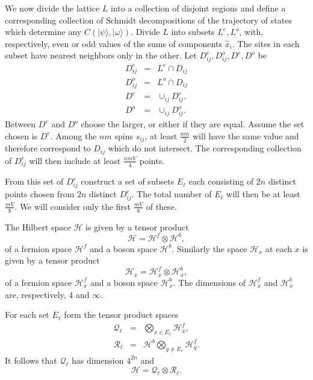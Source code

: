 \documentclass[12pt,amsmath,amssymb,onecolumn]{revtex4-2}
\begin{document}
We now divide the lattice $L$ into a collection
of disjoint regions and define a corresponding
collection of Schmidt decompositions of
the trajectory of states
which determine any $C( |\psi \rangle , |\omega \rangle )$.
Divide $L$ into subsets $L^e, L^o$, 
with, respectively, even or odd values of the sums
of components $\hat{x}_i$. The sites in each subset 
have nearest neighbors only in the other.
Let $D^e_{ij}, D^o_{ij}, D^e, D^o$ be 
\begin{subequations}
\begin{eqnarray}
\label{defdije}
D^e_{ij} & = & L^e \cap D_{ij} \\
D^o_{ij} & = & L^o \cap D_{ij} \\
D^e & = & \cup_{ij} D^e_{ij}. \\
D^o & = & \cup_{ij} D^o_{ij}.
\end{eqnarray}
\end{subequations}
Between $D^e$ and $D^o$ choose the larger,
or either if they are equal.
Assume the set chosen is $D^e$.
Among the $nm$ spins $s_{ij}$, at least $\frac{nm}{2}$
will have the same value and therefore correspond
to $D_{ij}$ which do not intersect.
The corresponding collection of $D^e_{ij}$
will then include at least $\frac{nmV}{4}$ points.

From this set of $D^e_{ij}$ construct a set of subsets $E_\ell$ 
each consisting of $2n$ distinct points chosen from $2n$ distinct $D^e_{ij}$.
The total number of $E_\ell$ will then be
at least $\frac{m V}{8}$.
We will consider only the first $\frac{m V}{8}$
of these.

The Hilbert space $\mathcal{H}$ is given by a tensor product
\begin{equation}
  \label{fermionbosonproduct}
  \mathcal{H} = \mathcal{H}^f \otimes \mathcal{H}^b,
\end{equation}
of a fermion space $\mathcal{H}^f$ and a boson space $\mathcal{H}^b$.
Similarly the space $\mathcal{H}_x$ at each $x$
is given by a tensor product
\begin{equation}
  \label{fermionbosonproductx}
  \mathcal{H}_x = \mathcal{H}_x^f \otimes \mathcal{H}_x^b,
\end{equation}
of a fermion space $\mathcal{H}_x^f$ and
a boson space $\mathcal{H}_x^b$.
The dimensions of
$\mathcal{H}_x^f$ and $\mathcal{H}_x^b$
are, respectively, 4 and $\infty$.

For each set $E_\ell$ form the 
tensor product spaces
\begin{subequations}
\begin{eqnarray}
\label{defqell}
\mathcal{Q}_\ell &=& \bigotimes_{x \in E_\ell} \mathcal{H}_x^f, \\
\label{defrell}
\mathcal{R}_\ell &=& \mathcal{H}^b\bigotimes_{q \ne E_\ell} \mathcal{H}_q^f.
\end{eqnarray}
\end{subequations}
It follows that $\mathcal{Q}_\ell$ has dimension $4^{2n}$
and
\begin{equation}
\label{deftp}
\mathcal{H} = \mathcal{Q}_\ell \otimes \mathcal{R}_\ell.
\end{equation}
\end{document}
